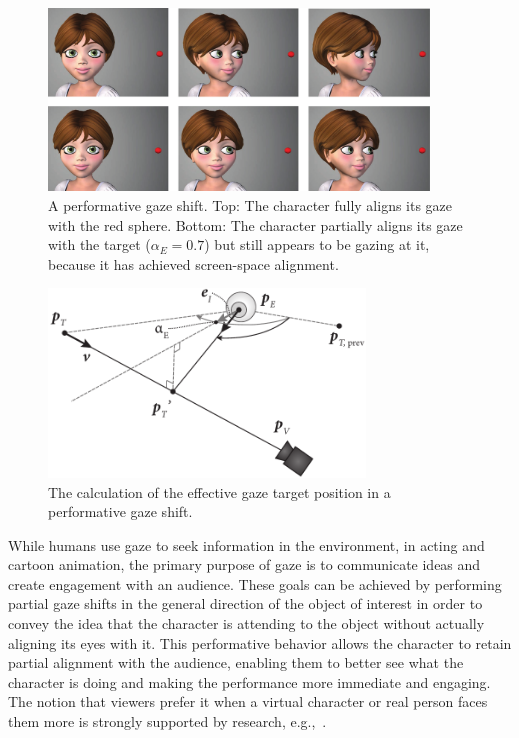 \begin{figure}
\centering
\includegraphics[width=0.9\textwidth]{stylizedgaze/Figures/PerformativeGazeExample-small.pdf}
\caption{A performative gaze shift. Top: The character fully aligns its gaze with the red sphere. Bottom: The character partially aligns its gaze with the target ($\alpha_E = 0.7$) but still appears to be gazing at it, because it has achieved screen-space alignment.}
\label{fig:PerformativeGazeExample}
\end{figure}

\begin{figure}
\centering
\includegraphics[width=0.75\textwidth]{stylizedgaze/Figures/EyeAlignment.pdf}
\caption{The calculation of the effective gaze target position in a performative gaze shift.}
\label{fig:EyeAlignment}
\end{figure}

While humans use gaze to seek information in the environment, in acting and cartoon animation, the primary purpose of gaze is to communicate ideas and create engagement with an audience. These goals can be achieved by performing partial gaze shifts in the general direction of the object of interest in order to convey the idea that the character is attending to the object without actually aligning its eyes with it. This performative behavior allows the character to retain partial alignment with the audience, enabling them to better see what the character is doing and making the performance more immediate and engaging. The notion that viewers prefer it when a virtual character or real person faces them more is strongly supported by research, e.g.,~\citep{beebe1976effects,andrist2012designing}.

